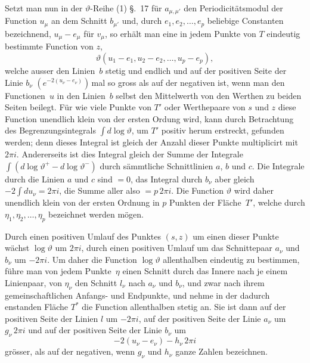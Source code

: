 \documentclass[a4paper,12pt,leqno]{article}
\begin{document}
Setzt man nun in der $\vartheta$-Reihe (1) \S.~17 f\"{u}r
$a_{\mu, \mu'}$ den Periodicit\"{a}tsmodul der Function $u_\mu$
an dem Schnitt $b_{\mu'}$ und, durch $e_1, e_2,\ldots, e_p$
beliebige Constanten bezeichnend, $u_\mu - e_\mu$ f\"{u}r
$v_\mu$, so erh\"{a}lt man eine in jedem Punkte von $T$ eindeutig
bestimmte Function von $z$,
\[ \vartheta( u_1 - e_1, u_2 - e_2,\ldots, u_p - e_p ),\]
welche ausser den Linien~$b$ stetig und endlich und auf der
positiven Seite der Linie $b_\nu$
$\left( e^{-2(u_\nu - e_\nu)} \right) \,$\-mal so gross als auf der
negativen ist, wenn man den Functionen~$u$ in den Linien~$b$
selbst den Mittelwerth von den Werthen zu beiden Seiten beilegt.
F\"{u}r wie viele Punkte von $T'$ oder Werthepaare von $s$ und
$z$ diese Function unendlich klein von der ersten Ordung wird,
kann durch Betrachtung des Begrenzungsintegrals
$\int d \log \vartheta$,
um $T'$ positiv herum erstreckt, gefunden werden; denn dieses
Integral ist gleich der Anzahl dieser Punkte multiplicirt mit
$2\pi i$.  Andererseits ist dies Integral gleich der Summe der
Integrale
$\int ( d \log \vartheta^+ - d \log \vartheta^-)$
durch s\"{a}mmtliche Schnittlinien $a$, $b$ und $c$.  Die
Integrale durch die Linien $a$ und $c$ sind $= 0$, das Integral
durch $b_\nu$ aber gleich $- 2 \int du_\nu = 2\pi i$, die Summe
aller also $= p \, 2 \pi i$.  Die Function $\vartheta$ wird daher
unendlich klein von der ersten Ordnung in $p$ Punkten der
Fl\"{a}che~$T'$, welche durch $\eta_1, \eta_2,\ldots, \eta_p$
bezeichnet werden m\"{o}gen.

Durch einen positiven Umlauf des Punktes $(s,z)$ um einen dieser
Punkte w\"{a}chst $\log \vartheta$ um $2\pi i$, durch einen
positiven Umlauf um das Schnittepaar $a_\nu$ und $b_\nu$ um
$-2 \pi i$.  Um daher die Function $\log \vartheta$ allenthalben
eindeutig zu bestimmen, f\"{u}hre man von jedem Punkte~$\eta$
einen Schnitt durch das Innere nach je einem Linienpaar, von
$\eta_\nu$ den Schnitt $l_\nu$ nach $a_\nu$ und $b_\nu$, und zwar
nach ihrem gemeinschaftlichen Anfangs- und Endpunkte, und nehme
in der dadurch enstanden Fl\"{a}che $T^*$ die Function
allenthalben stetig an.  Sie ist dann auf der positiven Seite der
Linien $l$ um $-2\pi i$, auf der positiven Seite der Linie
$a_\nu$ um $g_\nu \, 2 \pi i$ und auf der positiven Seite der
Linie $b_\nu$ um
\[ - 2 (u_\nu - e_\nu) - h_\nu \, 2 \pi i \]
gr\"{o}sser, als auf der negativen, wenn $g_\nu$ und $h_\nu$
ganze Zahlen bezeichnen.
\end{document}
